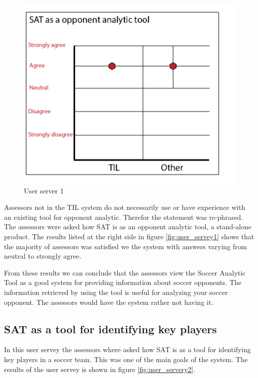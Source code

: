 \begin{figure}[ht!]
\centering
\includegraphics[width=1\textwidth]{images/evaluation/user_servery1}
\caption{User server 1}
\label{fig:user_servery1}
\end{figure}

Assessors not in the \ac{TIL} system do not necessarily use or have experience with an existing tool for opponent analytic. Therefor the statement was re-phrased. The assessors were asked how SAT is as an opponent analytic tool, a stand-alone product. The results listed at the right side in figure \ref{fig:user_servey1} shows that the majority of assessors was satisfied we the system with answers varying from neutral to strongly agree.

From these results we can conclude that the assessors view the Soccer Analytic Tool as a good system for providing information about soccer opponents. The information retrieved by using the tool is useful for analyzing your soccer opponent. The assessors would have the system rather not having it.

\subsection{SAT as a tool for identifying key players}

In this user servey the assessors where asked how SAT is as a tool for identifying key players in a soccer team. This was one of the main goals of the system. The results of the user servey is shown in figure \ref{fig:user_servery2}.

